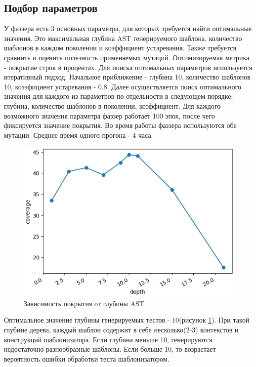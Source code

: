 \documentclass[a4paper]{article}
\begin{document}
\subsection{Подбор параметров}

У фаззера есть 3 основных параметра, для которых требуется найти оптимальные значения. Это максимальная глубина AST генерируемого шаблона, количество шаблонов в каждом поколении и коэффициент устаревания. Также требуется сравнить и оценить полезность применяемых мутаций. Оптимизируемая метрика - покрытие строк в процентах. Для поиска оптимальных параметров используется итеративный подход. Начальное приближение - глубина 10, количество шаблонов 10, коээфициент устаревания - 0.8. Далее осуществляется поиск оптимального значения для каждого из параметров по отдельности в следующем порядке: глубина, количество шаблонов в поколении, коэффициент. Для каждого возможного значения параметра фаззер работает 100 эпох, после чего фиксируется значение покрытия. Во время работы фаззера используются обе мутации. Среднее время одного прогона - 4 часа. 

\begin{figure}[ht!]
    \includegraphics[width=170mm]{depth.png}
    \caption{Зависимость покрытия от глубины AST}
    \label{Depth}
    \end{figure}

Оптимальное значение глубины генерируемых тестов - 10(рисунок \ref{Depth}). При такой глубине дерева, каждый шаблон содержит в себе несколько(2-3) контекстов и конструкций шаблонизатора. Если глубина меньше 10, генерируются недостаточно разнообразные шаблоны. Если больше 10, то возрастает вероятность ошибки обработки теста шаблонизатором.
\end{document}

